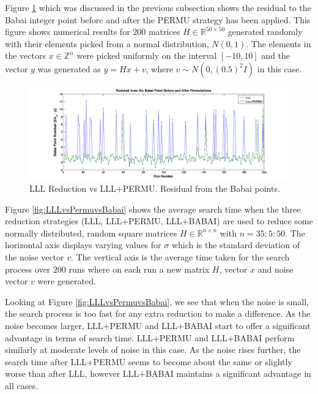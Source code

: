 \documentclass[12pt,Bold,letterpaper]{mcgilletdclass}
\begin{document}
Figure \ref{fig:LLLvsPermuBabai} which was discussed in the previous subsection
shows the residual to the Babai integer point before and after the PERMU strategy has
been applied. This figure shows numerical results for $200$ matrices $H \in\mathbb{R}^{50
\times 50}$ generated randomly with their elements picked from a normal
distribution, $N(0,1)$. The elements in the vectors $x \in \mathbb{Z}^n$ were picked
uniformly on the interval $[-10,10]$ and the vector $y$ was generated as $y = Hx
+ v$, where $v \sim N(0,(0.5)^2I)$ in this case.

\begin{figure}
\centering
\includegraphics[scale=0.36]{lllvslllpermubabai.png}
\caption{LLL Reduction vs LLL+PERMU. Residual from the Babai points.}
\label{fig:LLLvsPermuBabai}
\end{figure}

Figure \ref{fig:LLLvsPermuvsBabai} shows the average search time when the three reduction strategies (LLL, LLL+PERMU, LLL+BABAI) are used to reduce some normally distributed, random square matrices $H \in \mathbb{R}^{n \times n}$ with $ n = 35:5:50$. The horizontal axis displays varying values for $\sigma$ which is the standard deviation of the noise vector $v$. The vertical axis is the average time taken for the search process over $200$ runs where on each run a new matrix $H$, vector $x$ and noise vector $v$ were generated.

Looking at Figure \ref{fig:LLLvsPermuvsBabai}, we see that when the noise is
small, the search process is too fast for any extra reduction to make a
difference. As the noise becomes larger, LLL+PERMU and LLL+BABAI start to offer a significant
advantage in terms of search time. LLL+PERMU and LLL+BABAI perform similarly at
moderate levels of noise in this case. As the noise rises further, the search time after LLL+PERMU seems to become about the same or slightly worse than after LLL, however LLL+BABAI maintains a significant
advantage in all cases.
\end{document}
